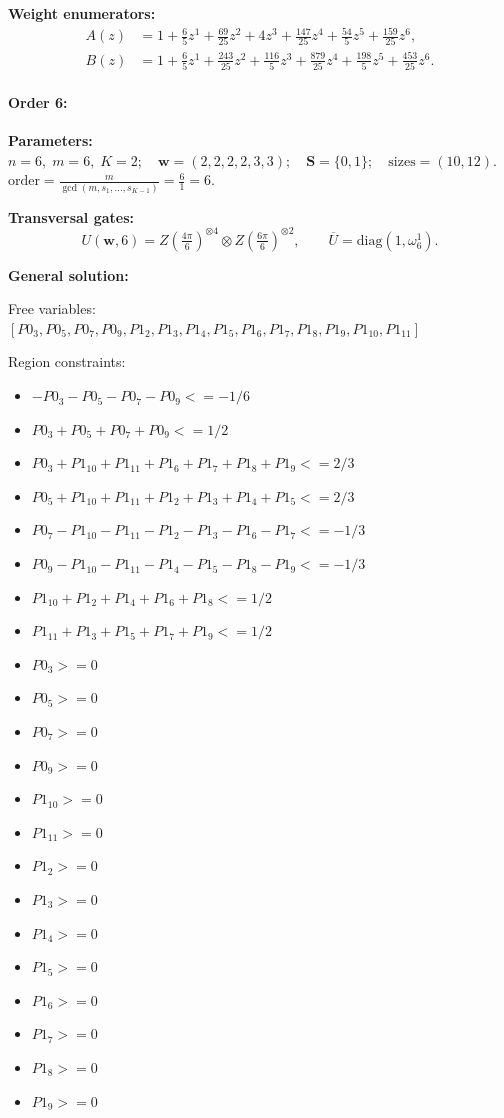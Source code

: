 \documentclass[11pt]{article}
\begin{document}
\noindent\textbf{Weight enumerators:}
\begin{align*}
A(z) &= 1 + \tfrac{6}{5}z^{1} + \tfrac{69}{25}z^{2} + 4z^{3} + \tfrac{147}{25}z^{4} + \tfrac{54}{5}z^{5} + \tfrac{159}{25}z^{6},\\[2pt]
B(z) &= 1 + \tfrac{6}{5}z^{1} + \tfrac{243}{25}z^{2} + \tfrac{116}{5}z^{3} + \tfrac{879}{25}z^{4} + \tfrac{198}{5}z^{5} + \tfrac{453}{25}z^{6}.
\end{align*}

\paragraph{\textbf{Order 6:}}
\noindent\textbf{Parameters:} $n=6,\; m=6,\; K=2;\quad \mathbf w=(2, 2, 2, 2, 3, 3);\quad \mathbf S=\{0, 1\};\quad \text{sizes}=\left(10, 12\right).$ $\displaystyle \text{order}=\frac{m}{\gcd(m,s_1,\dots,s_{K-1})}=\frac{6}{1}=6.$

\noindent\textbf{Transversal gates:}
\[
    U(\mathbf w,6)=Z \left(\tfrac{4\pi}{6}\right)^{\otimes4} \otimes Z \left(\tfrac{6\pi}{6}\right)^{\otimes2} ,\qquad
    \overline U=\mathrm{diag}(1,\omega_{6}^{1}).
\]

\noindent\textbf{General solution:}

Free variables: $[P0_3, P0_5, P0_7, P0_9, P1_2, P1_3, P1_4, P1_5, P1_6, P1_7, P1_8, P1_9, P1_{10}, P1_{11}]$

Region constraints:
\begin{itemize}
    \item $-P0_3 - P0_5 - P0_7 - P0_9 <= -1/6$
    \item $P0_3 + P0_5 + P0_7 + P0_9 <= 1/2$
    \item $P0_3 + P1_{10} + P1_{11} + P1_6 + P1_7 + P1_8 + P1_9 <= 2/3$
    \item $P0_5 + P1_{10} + P1_{11} + P1_2 + P1_3 + P1_4 + P1_5 <= 2/3$
    \item $P0_7 - P1_{10} - P1_{11} - P1_2 - P1_3 - P1_6 - P1_7 <= -1/3$
    \item $P0_9 - P1_{10} - P1_{11} - P1_4 - P1_5 - P1_8 - P1_9 <= -1/3$
    \item $P1_{10} + P1_2 + P1_4 + P1_6 + P1_8 <= 1/2$
    \item $P1_{11} + P1_3 + P1_5 + P1_7 + P1_9 <= 1/2$
    \item $P0_3 >= 0$
    \item $P0_5 >= 0$
    \item $P0_7 >= 0$
    \item $P0_9 >= 0$
    \item $P1_{10} >= 0$
    \item $P1_{11} >= 0$
    \item $P1_2 >= 0$
    \item $P1_3 >= 0$
    \item $P1_4 >= 0$
    \item $P1_5 >= 0$
    \item $P1_6 >= 0$
    \item $P1_7 >= 0$
    \item $P1_8 >= 0$
    \item $P1_9 >= 0$
\end{itemize}
\end{document}
